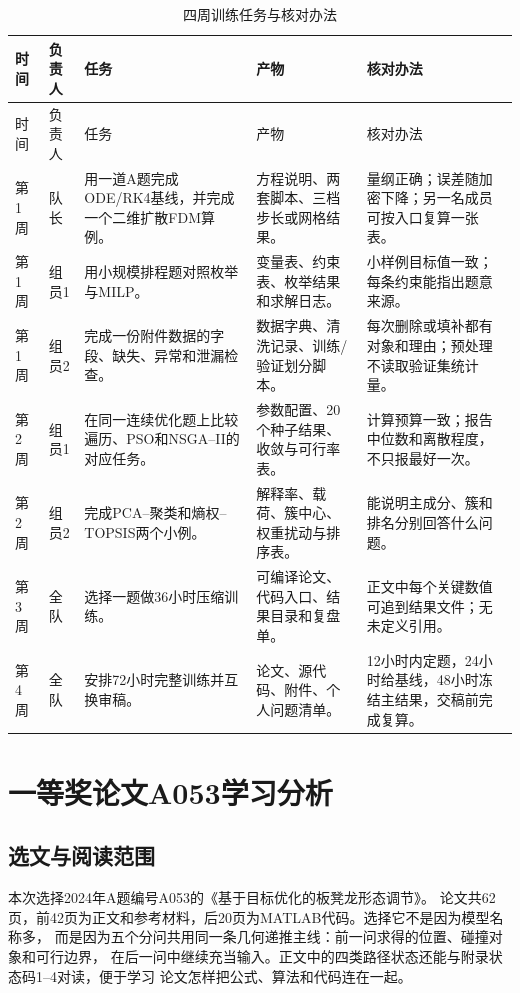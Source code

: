 \documentclass[UTF8,zihao=-4]{ctexart}
\begin{document}
\small
\begin{longtable}{p{1.3cm}p{1.3cm}p{3.9cm}p{4.7cm}p{4.15cm}}
\caption{四周训练任务与核对办法}\label{tab:four-week-plan}\\
\toprule
时间 & 负责人 & 任务 & 产物 & 核对办法\\
\midrule
\endfirsthead
\toprule
时间 & 负责人 & 任务 & 产物 & 核对办法\\
\midrule
\endhead
\bottomrule
\endfoot
第1周 & 队长 & 用一道A题完成ODE/RK4基线，并完成一个二维扩散FDM算例。
& 方程说明、两套脚本、三档步长或网格结果。 & 量纲正确；误差随加密下降；另一名成员可按入口复算一张表。\\
第1周 & 组员1 & 用小规模排程题对照枚举与MILP。 & 变量表、约束表、枚举结果和求解日志。 & 小样例目标值一致；每条约束能指出题意来源。\\
第1周 & 组员2 & 完成一份附件数据的字段、缺失、异常和泄漏检查。 & 数据字典、清洗记录、训练/验证划分脚本。 & 每次删除或填补都有对象和理由；预处理不读取验证集统计量。\\
第2周 & 组员1 & 在同一连续优化题上比较遍历、PSO和NSGA--II的对应任务。 & 参数配置、20个种子结果、收敛与可行率表。 & 计算预算一致；报告中位数和离散程度，不只报最好一次。\\
第2周 & 组员2 & 完成PCA--聚类和熵权--TOPSIS两个小例。 & 解释率、载荷、簇中心、权重扰动与排序表。 & 能说明主成分、簇和排名分别回答什么问题。\\
第3周 & 全队 & 选择一题做36小时压缩训练。 & 可编译论文、代码入口、结果目录和复盘单。 & 正文中每个关键数值可追到结果文件；无未定义引用。\\
第4周 & 全队 & 安排72小时完整训练并互换审稿。 & 论文、源代码、附件、个人问题清单。 & 12小时内定题，24小时给基线，48小时冻结主结果，交稿前完成复算。\\
\end{longtable}
\normalsize

\section{一等奖论文A053学习分析}

\subsection{选文与阅读范围}

本次选择2024年A题编号A053的《基于目标优化的板凳龙形态调节》\cite{A053}。
论文共62页，前42页为正文和参考材料，后20页为MATLAB代码。选择它不是因为模型名称多，
而是因为五个分问共用同一条几何递推主线：前一问求得的位置、碰撞对象和可行边界，
在后一问中继续充当输入。正文中的四类路径状态还能与附录状态码1--4对读，便于学习
论文怎样把公式、算法和代码连在一起。
\end{document}
